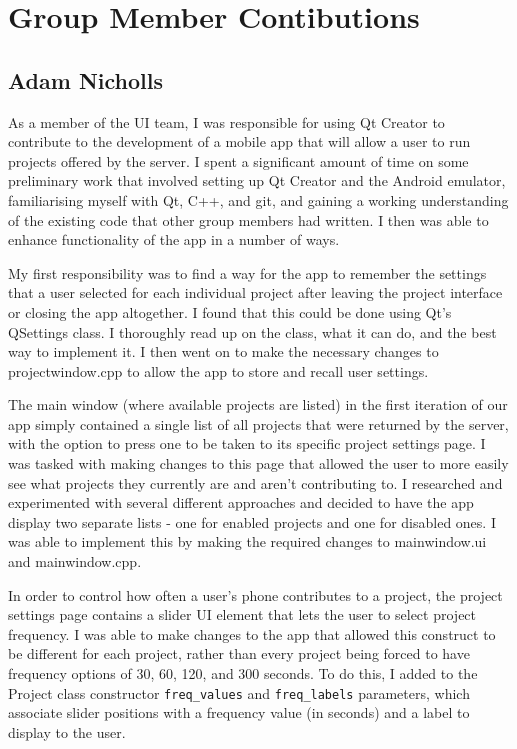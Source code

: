 \documentclass{article}
\begin{document}
\section{Group Member Contibutions}
\subsection{Adam Nicholls}
As a member of the UI team, I was responsible for using Qt Creator to contribute to the development of a mobile app that will allow a user to
run projects offered by the server. I spent a significant amount of time on some preliminary work that involved setting up Qt Creator and the
Android emulator, familiarising myself with Qt, C++, and git, and gaining a working understanding of the existing code that other group members
had written. I then was able to enhance functionality of the app in a number of ways.

My first responsibility was to find a way for the app to remember the settings that a user selected for each individual project after leaving
the project interface or closing the app altogether. I found that this could be done using Qt’s QSettings class. I thoroughly read up on the
class, what it can do, and the best way to implement it. I then went on to make the necessary changes to projectwindow.cpp to allow the app
to store and recall user settings.

The main window (where available projects are listed) in the first iteration of our app simply contained a single list of all projects that
were returned by the server, with the option to press one to be taken to its specific project settings page. I was tasked with making changes
to this page that allowed the user to more easily see what projects they currently are and aren’t contributing to. I researched and experimented
with several different approaches and decided to have the app display two separate lists - one for enabled projects and one for disabled ones.
I was able to implement this by making the required changes to mainwindow.ui and mainwindow.cpp.

In order to control how often a user’s phone contributes to a project, the project settings page contains a slider UI element that lets the user
to select project frequency. I was able to make changes to the app that allowed this construct to be different for each project, rather than
every project being forced to have frequency options of 30, 60, 120, and 300 seconds. To do this, I added to the Project class constructor
\texttt{freq\_values} and \texttt{freq\_labels} parameters, which associate slider positions with a frequency value (in seconds) and a label
to display to the user.
\end{document}
